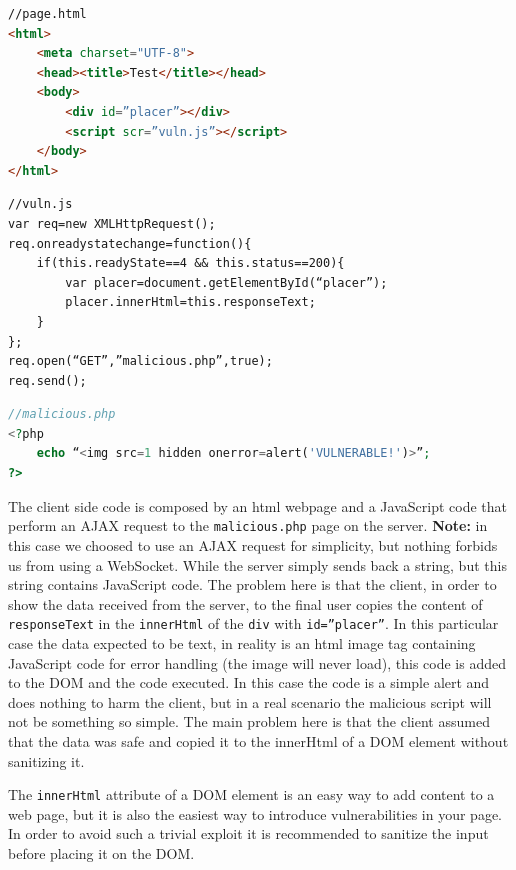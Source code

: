 \begin{lstlisting}[language=html]
//page.html
<html>
	<meta charset="UTF-8">
	<head><title>Test</title></head>
	<body>
		<div id=”placer”></div>
		<script scr=”vuln.js”></script>
	</body>
</html>
\end{lstlisting}

\begin{lstlisting}
//vuln.js
var req=new XMLHttpRequest();
req.onreadystatechange=function(){
	if(this.readyState==4 && this.status==200){
		var placer=document.getElementById(“placer”);
		placer.innerHtml=this.responseText;
	}
};
req.open(“GET”,”malicious.php”,true);
req.send();
\end{lstlisting}

\begin{lstlisting}[language=php]
//malicious.php
<?php
	echo “<img src=1 hidden onerror=alert('VULNERABLE!')>”;
?>
\end{lstlisting}

The client side code is composed by an html webpage and a JavaScript code that perform an AJAX request to the \texttt{malicious.php} page on the server.\newline
\textbf{Note:} in this case we choosed to use an AJAX request for simplicity, but nothing forbids us from using a WebSocket.\newline
While the server simply sends back a string, but this string contains JavaScript code.\newline
The problem here is that the client, in order to show the data received from the server, to the final user copies the content of \texttt{responseText} in the \texttt{innerHtml} of the \texttt{div} with \texttt{id=”placer”}.
In this particular case the data expected to be text, in reality is an html image tag containing JavaScript code for error handling (the image will never load), this code is added to the DOM and the code executed.\newline
In this case the code is a simple alert and does nothing to harm the client, but in a real scenario the malicious script will not be something so simple.\newline
The main problem here is that the client assumed that the data was safe and copied it to the innerHtml of a DOM element without sanitizing it.\newline

The \texttt{innerHtml} attribute of a DOM element is an easy way to add content to a web page, but it is also the easiest way to introduce vulnerabilities in your page.
In order to avoid such a trivial exploit it is recommended to sanitize the input before placing it on the DOM.\newline

